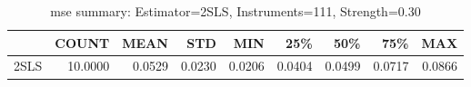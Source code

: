 \begin{table}[ht]
\centering
\caption{mse summary: Estimator=2SLS, Instruments=111, Strength=0.30}
\begin{tabular}{lrrrrrrrr}
\toprule
 & COUNT & MEAN & STD & MIN & 25\% & 50\% & 75\% & MAX \\
\midrule
2SLS & 10.0000 & 0.0529 & 0.0230 & 0.0206 & 0.0404 & 0.0499 & 0.0717 & 0.0866 \\
\bottomrule
\end{tabular}
\end{table}
